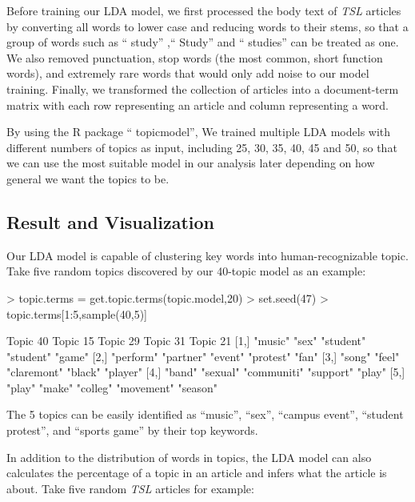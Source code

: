 \documentclass[a4paper]{article}
\begin{document}
Before training our LDA model, we first processed the body text of \textit{TSL} articles by converting all words to lower case and reducing words to their stems, so that a group of words such as `` study'' ,`` Study''  and `` studies''  can be treated as one. We also removed punctuation, stop words (the most common, short function words), and extremely rare words that would only add noise to our model training. Finally, we transformed the collection of articles into a document-term matrix with each row representing an article and column representing a word. 

By using the R package `` topicmodel'', We trained multiple LDA models with different numbers of topics as input, including 25, 30, 35, 40, 45 and 50, so that we can use the most suitable model in our analysis later depending on how general we want the topics to be.

\subsection{Result and Visualization}

Our LDA model is capable of clustering key words into human-recognizable topic. Take five random topics discovered by our 40-topic model as an example:

\begin{Schunk}
\begin{Sinput}
> topic.terms = get.topic.terms(topic.model,20)
> set.seed(47)
> topic.terms[1:5,sample(40,5)]
\end{Sinput}
\begin{Soutput}
     Topic 40  Topic 15  Topic 29    Topic 31   Topic 21
[1,] "music"   "sex"     "student"   "student"  "game"  
[2,] "perform" "partner" "event"     "protest"  "fan"   
[3,] "song"    "feel"    "claremont" "black"    "player"
[4,] "band"    "sexual"  "communiti" "support"  "play"  
[5,] "play"    "make"    "colleg"    "movement" "season"
\end{Soutput}
\end{Schunk}

The 5 topics can be easily identified as ``music'', ``sex'', ``campus event'', ``student protest'', and ``sports game'' by their top keywords.

In addition to the distribution of words in topics, the LDA model can also calculates the percentage of a topic in an article and infers what the article is about. Take five random \textit{TSL} articles for example:
\end{document}
